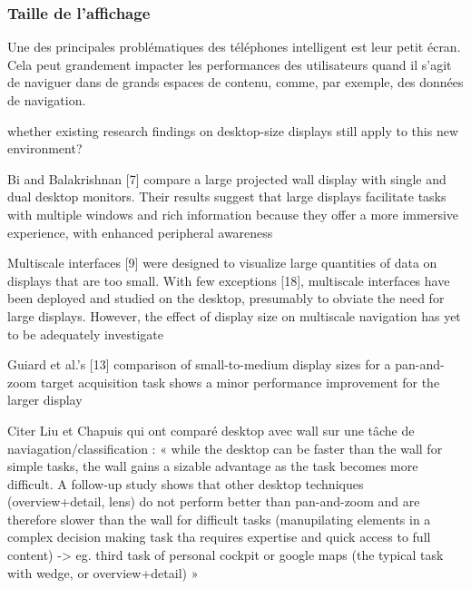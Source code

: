 

\iffalse
\subsubsection{IHM autres que du IHM multiaffichage}
\paragraph{}
IHM hybride : mobile pour entrée, et hmd pour sortie \cite{LeeBudhirajaBillinghurst2013}
\fi


\subsubsection{Taille de l'affichage}
Une des principales problématiques des téléphones intelligent est leur petit écran. Cela peut grandement impacter les performances des utilisateurs quand il s'agit de naviguer dans de grands espaces de contenu, comme, par exemple, des données de navigation.

whether existing research findings on desktop-size displays still apply to this new environment?

Bi and Balakrishnan [7] compare a large projected wall display with single and dual desktop monitors. Their results suggest that large displays facilitate tasks with multiple windows and rich information because they offer a more immersive experience, with enhanced peripheral awareness

Multiscale interfaces [9] were designed to visualize large quantities of data on displays that are too small. With few exceptions [18], multiscale interfaces have been deployed and studied on the desktop, presumably to obviate the need for large displays. However, the effect of display size on multiscale navigation has yet to be adequately investigate

Guiard et al.’s [13] comparison of small-to-medium display sizes for a pan-and-zoom target acquisition task shows a minor performance improvement for the larger display

Citer Liu et Chapuis qui ont comparé desktop avec wall sur une tâche de naviagation/classification : 
« while the desktop can be faster than the wall for simple tasks, the wall gains a sizable advantage as the task becomes more difficult. A follow-up study shows that other desktop techniques (overview+detail, lens) do not perform better than pan-and-zoom and are therefore slower than the wall for difficult tasks (manupilating elements in a complex decision making task tha requires expertise and quick access to full content) -> eg. third task of personal cockpit or google maps (the typical task with wedge, or overview+detail) »

